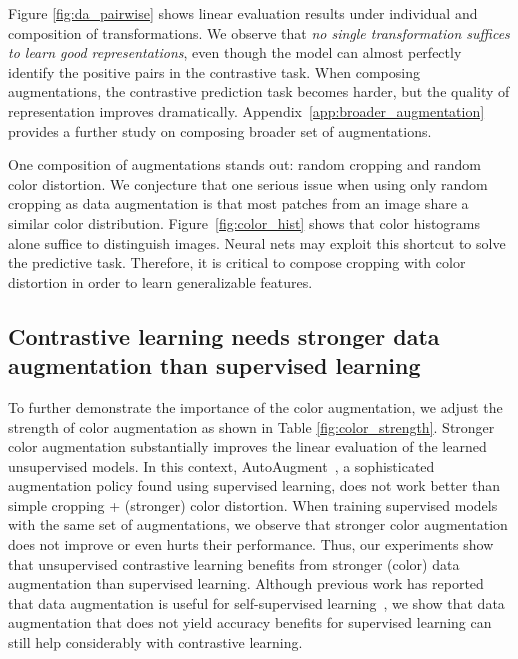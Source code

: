 Figure \ref{fig:da_pairwise} shows linear evaluation results under individual and composition of transformations. We observe that \textit{no single transformation suffices to learn good representations}, even though the model can almost perfectly identify the positive pairs in the contrastive task. When composing augmentations, the contrastive prediction task becomes harder, but the quality of representation improves dramatically. Appendix~\ref{app:broader_augmentation} provides a further study on composing broader set of augmentations.

One composition of augmentations stands out: random cropping and random color distortion. We conjecture that one serious issue when using only random cropping as data augmentation is that most patches from an image share a similar color distribution. Figure~\ref{fig:color_hist} shows that color histograms alone suffice to distinguish images. Neural nets may exploit this shortcut to solve the predictive task. Therefore, it is critical to compose cropping with color distortion in order to learn generalizable features. 

\subsection{Contrastive learning needs stronger data augmentation than supervised learning}


To further demonstrate the importance of the color augmentation, we adjust the strength of color augmentation as shown in Table \ref{fig:color_strength}. Stronger color augmentation substantially improves the linear evaluation of the learned unsupervised models. In this context, AutoAugment~\cite{cubuk2019autoaugment}, a sophisticated augmentation policy found using supervised learning, does not work better than simple cropping + (stronger) color distortion. When training supervised models with the same set of augmentations, we observe that stronger color augmentation does not improve or even hurts their performance. Thus, our experiments show that unsupervised contrastive learning benefits from stronger (color) data augmentation than supervised learning. Although previous work has reported that data augmentation is useful for self-supervised learning~\cite{doersch2015unsupervised,bachman2019learning,henaff2019data,asano2019critical}, we show that data augmentation that does not yield accuracy benefits for supervised learning can still help considerably with contrastive learning.

